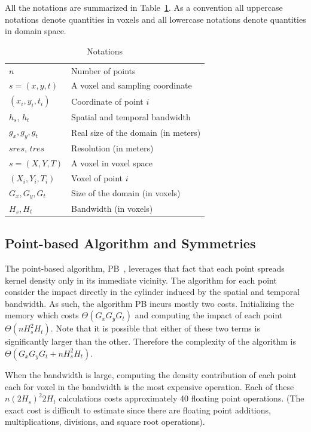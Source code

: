 \documentclass[10pt, conference, compsocconf]{IEEEtran}
\begin{document}
All the notations are summarized in Table~\ref{tab:notation}. As a
convention all uppercase notations denote quantities in voxels and all
lowercase notations denote quantities in domain space.

\begin{table}
  \centering
  \begin{tabular}{|l|l|}
    \hline 
    $n$ & Number of points\\
    $s = (x,y,t)$ & A voxel and sampling coordinate\\
    $(x_i, y_i, t_i)$ & Coordinate of point $i$\\
    $h_s$, $h_t$ & Spatial and temporal bandwidth \\ 
    $g_x, g_y, g_t$ & Real size of the domain (in meters) \\
    \hline
    $sres$, $tres$ & Resolution (in meters) \\
    $s = (X,Y,T)$ & A voxel in voxel space\\
    $(X_i, Y_i, T_i)$ & Voxel of point $i$\\
    $G_x, G_y, G_t$ & Size of the domain (in voxels)\\
    $H_s, H_t$ & Bandwidth (in voxels) \\
    \hline 
  \end{tabular}
  \caption{Notations}
  \label{tab:notation}
  \vspace*{-3em}
\end{table}


\subsection{Point-based Algorithm and Symmetries}

The point-based algorithm, PB~\cite{Saule17-ICPP}, leverages that fact
that each point spreads  kernel density only in its immediate vicinity. The algorithm
for each point consider the impact directly in the cylinder induced by
the spatial and temporal bandwidth. As such, the algorithm PB incurs
mostly two costs. Initializing the memory which costs $\Theta(G_x G_y
G_t)$ and computing the impact of each point $\Theta(n H_s^2
H_t)$. Note that it is possible that either of these two terms is
significantly larger than the other. Therefore the complexity of the
algorithm is $\Theta(G_x G_y G_t + n H_s^2 H_t)$.

When the bandwidth is large, computing the density contribution of each
point each for voxel in the bandwidth is the most expensive
operation. Each of these $n (2  H_s)^2  2 H_t$ calculations costs
approximately 40 floating point operations. (The exact cost is
difficult to estimate since there are floating point additions,
multiplications, divisions, and square root operations).
\end{document}
